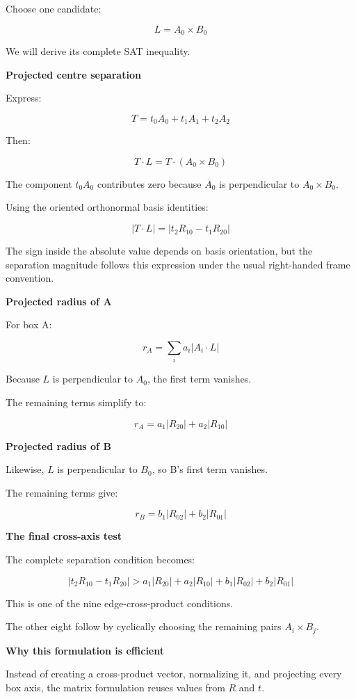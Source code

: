 Choose one candidate:

\[
\boxed{ L=A_0\times B_0 }
\]

We will derive its complete SAT inequality.

\textbf{Projected centre separation}

Express:

\[
T=t_0A_0+t_1A_1+t_2A_2
\]

Then:

\[
T\cdot L= T\cdot(A_0\times B_0)
\]

The component \(t_0A_0\) contributes zero because \(A_0\) is perpendicular to \(A_0\times B_0\).

Using the oriented orthonormal basis identities:

\[
\boxed{ |T\cdot L|= |t_2R_{10}-t_1R_{20}| }
\]

The sign inside the absolute value depends on basis orientation, but the separation magnitude follows this expression under the usual right-handed frame convention.

\textbf{Projected radius of A}

For box A:

\[
r_A= \sum_i a_i|A_i\cdot L|
\]

Because \(L\) is perpendicular to \(A_0\), the first term vanishes.

The remaining terms simplify to:

\[
\boxed{ r_A=a_1|R_{20}|+a_2|R_{10}| }
\]

\textbf{Projected radius of B}

Likewise, \(L\) is perpendicular to \(B_0\), so B's first term vanishes.

The remaining terms give:

\[
\boxed{ r_B=b_1|R_{02}|+b_2|R_{01}| }
\]

\textbf{The final cross-axis test}

The complete separation condition becomes:

\[
\boxed{ |t_2R_{10}-t_1R_{20}| > a_1|R_{20}|+ a_2|R_{10}|+ b_1|R_{02}|+ b_2|R_{01}| }
\]

This is one of the nine edge-cross-product conditions.

The other eight follow by cyclically choosing the remaining pairs \(A_i\times B_j\).

\textbf{Why this formulation is efficient}

Instead of creating a cross-product vector, normalizing it, and projecting every box axis, the matrix formulation reuses values from \(R\) and \(t\).

